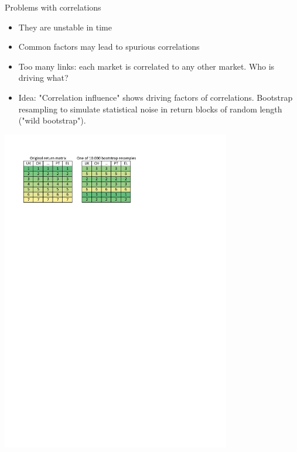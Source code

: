 \documentclass{beamer}
\begin{document}
\begin{frame}{Problems with correlations}
\begin{itemize}
  \item They are unstable in time
 \item Common factors may lead to spurious correlations
 \item Too many links: each market is correlated to any other market. Who is driving what?
 \item Idea: "Correlation influence" shows driving factors of correlations.
Bootstrap resampling to simulate statistical noise in return blocks of random length ("wild bootstrap").
\end{itemize}
\includegraphics[width=10cm]{bootstrap_resampling.pdf}

\end{frame}
\end{document}
